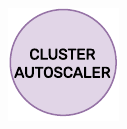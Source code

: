 \begin{figure}
  \centering
  \includegraphics[width=\linewidth]{images/architecture/cluster_autoscaler.pdf}
\end{figure}

